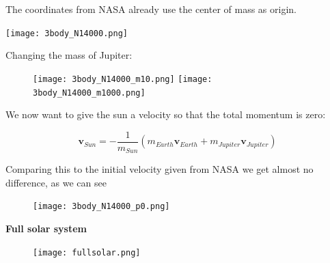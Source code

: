 \documentclass[11pt]{article}
\begin{document}
\begin{flushleft}
\begin{flushleft}
The coordinates from NASA already use the center of mass as origin. 

\begin{center}
\texttt{[image: 3body\_N14000.png]}
\end{center}

Changing the mass of Jupiter:

\begin{figure}
\begin{center}
\texttt{[image: 3body\_N14000\_m10.png]}
\texttt{[image: 3body\_N14000\_m1000.png]}
\end{center}
\end{figure}

We now want to give the sun a velocity so that the total momentum is zero: 

$$
\textbf{v}_{Sun} =- \frac{1}{m_{Sun} } ( m_{Earth} \textbf{v}_{Earth} + m_{Jupiter} \textbf{v}_{Jupiter})
$$

Comparing this to the initial velocity given from NASA we get almost no difference, as we can see

\begin{figure}
\begin{center}
\texttt{[image: 3body\_N14000\_p0.png]}
\end{center}
\end{figure}

\textbf{Full solar system}

\begin{figure}
\begin{center}
\texttt{[image: fullsolar.png]}
\end{center}
\end{figure}
\end{flushleft}












\end{flushleft}
\end{document}
